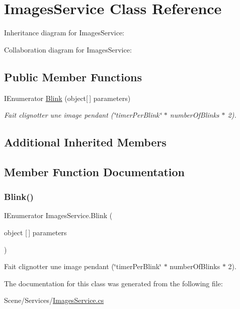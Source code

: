 \hypertarget{class_images_service}{}\section{Images\+Service Class Reference}
\label{class_images_service}


Inheritance diagram for Images\+Service\+:


Collaboration diagram for Images\+Service\+:
\subsection*{Public Member Functions}
\begin{DoxyCompactItemize}
\item 
I\+Enumerator \hyperlink{class_images_service_a5d48cde958c435b41323af094ce7ffdf}{Blink} (object\mbox{[}$\,$\mbox{]} parameters)
\begin{DoxyCompactList}\small\item\em Fait clignotter une image pendant (\char`\"{}timer\+Per\+Blink\char`\"{} $\ast$ number\+Of\+Blinks $\ast$ 2). \end{DoxyCompactList}\end{DoxyCompactItemize}
\subsection*{Additional Inherited Members}


\subsection{Member Function Documentation}
\mbox{\label{class_images_service_a5d48cde958c435b41323af094ce7ffdf}} 
\subsubsection{\texorpdfstring{Blink()}{Blink()}}
{\footnotesize\ttfamily I\+Enumerator Images\+Service.\+Blink (\begin{DoxyParamCaption}\item[{object \mbox{[}$\,$\mbox{]}}]{parameters }\end{DoxyParamCaption})\hspace{0.3cm}{\ttfamily [inline]}}



Fait clignotter une image pendant (\char`\"{}timer\+Per\+Blink\char`\"{} $\ast$ number\+Of\+Blinks $\ast$ 2). 



The documentation for this class was generated from the following file\+:\begin{DoxyCompactItemize}
\item 
Scene/\+Services/\hyperlink{_images_service_8cs}{Images\+Service.\+cs}\end{DoxyCompactItemize}
